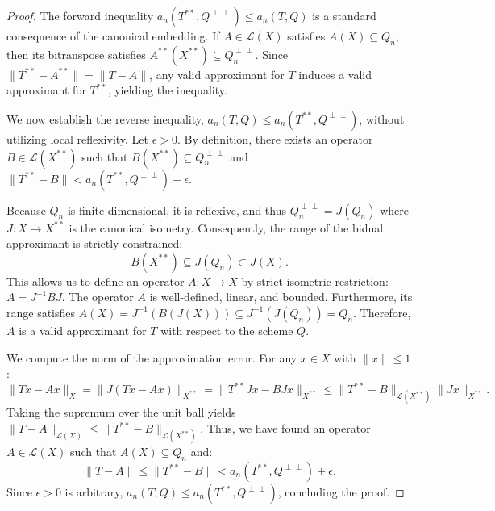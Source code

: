\documentclass[10pt,a4paper]{amsart}
\begin{document}
\begin{proof}
The forward inequality $a_n(T^{**}, Q^{\perp\perp}) \le a_n(T, Q)$ is a standard consequence of the canonical embedding. If $A \in \mathcal{L}(X)$ satisfies $A(X) \subseteq Q_n$, then its bitranspose satisfies $A^{**}(X^{**}) \subseteq Q_n^{\perp\perp}$. Since $\|T^{**} - A^{**}\| = \|T - A\|$, any valid approximant for $T$ induces a valid approximant for $T^{**}$, yielding the inequality.

We now establish the reverse inequality, $a_n(T, Q) \le a_n(T^{**}, Q^{\perp\perp})$, without utilizing local reflexivity. Let $\epsilon > 0$. By definition, there exists an operator $B \in \mathcal{L}(X^{**})$ such that $B(X^{**}) \subseteq Q_n^{\perp\perp}$ and $\|T^{**} - B\| < a_n(T^{**}, Q^{\perp\perp}) + \epsilon$.

Because $Q_n$ is finite-dimensional, it is reflexive, and thus $Q_n^{\perp\perp} = J(Q_n)$ where $J: X \to X^{**}$ is the canonical isometry. Consequently, the range of the bidual approximant is strictly constrained:
\begin{equation}
B(X^{**}) \subseteq J(Q_n) \subset J(X).
\end{equation}
This allows us to define an operator $A: X \to X$ by strict isometric restriction: $A = J^{-1} B J$. The operator $A$ is well-defined, linear, and bounded. Furthermore, its range satisfies $A(X) = J^{-1}(B(J(X))) \subseteq J^{-1}(J(Q_n)) = Q_n$. Therefore, $A$ is a valid approximant for $T$ with respect to the scheme $Q$.

We compute the norm of the approximation error. For any $x \in X$ with $\|x\| \le 1$:
\begin{equation}
\|Tx - Ax\|_X = \|J(Tx - Ax)\|_{X^{**}} = \|T^{**}Jx - BJx\|_{X^{**}} \le \|T^{**} - B\|_{\mathcal{L}(X^{**})} \|Jx\|_{X^{**}}.
\end{equation}
Taking the supremum over the unit ball yields $\|T - A\|_{\mathcal{L}(X)} \le \|T^{**} - B\|_{\mathcal{L}(X^{**})}$. Thus, we have found an operator $A \in \mathcal{L}(X)$ such that $A(X) \subseteq Q_n$ and:
\begin{equation}
\|T - A\| \le \|T^{**} - B\| < a_n(T^{**}, Q^{\perp\perp}) + \epsilon.
\end{equation}
Since $\epsilon > 0$ is arbitrary, $a_n(T, Q) \le a_n(T^{**}, Q^{\perp\perp})$, concluding the proof.
\end{proof}
\end{document}
